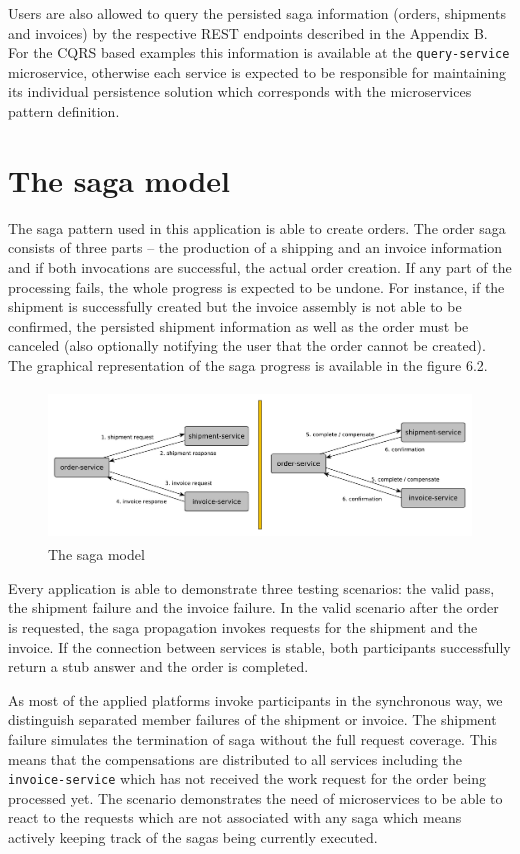 \documentclass[oneside,
  digital, %
  table,   %
  nolof,     %
  nolot,     %
]{fithesis3}
\begin{document}
Users are also allowed to query the persisted saga information (orders, shipments and invoices) by the respective REST endpoints described in the Appendix B. For the CQRS based examples this information is available at the \texttt{query-service} microservice, otherwise each service is expected to be responsible for maintaining its individual persistence solution which corresponds with the microservices pattern definition.

\section{The saga model}

The saga pattern used in this application is able to create orders. The order saga consists of three parts -- the production of a shipping and an invoice information and if both invocations are successful, the actual order creation. If any part of the processing fails, the whole progress is expected to be undone. For instance, if the shipment is successfully created but the invoice assembly is not able to be confirmed, the persisted shipment information as well as the order must be canceled (also optionally notifying the user that the order cannot be created). The graphical representation of the saga progress is available in the figure 6.2.

\begin{figure}
    \begin{center}
        \includegraphics[height=40mm]{images/sagaModel.pdf}
    \end{center}
    \caption{The saga model}
\end{figure}

Every application is able to demonstrate three testing scenarios: the valid pass, the shipment failure and the invoice failure. In the valid scenario after the order is requested, the saga propagation invokes requests for the shipment and the invoice. If the connection between services is stable, both participants successfully return a stub answer and the order is completed. 

As most of the applied platforms invoke participants in the synchronous way, we distinguish separated member failures of the shipment or invoice. The shipment failure simulates the termination of saga without the full request coverage. This means that the compensations are distributed to all services including the \texttt{invoice-service} which has not received the work request for the order being processed yet. The scenario demonstrates the need of microservices to be able to react to the requests which are not associated with any saga which means actively keeping track of the sagas being currently executed. 
\end{document}
